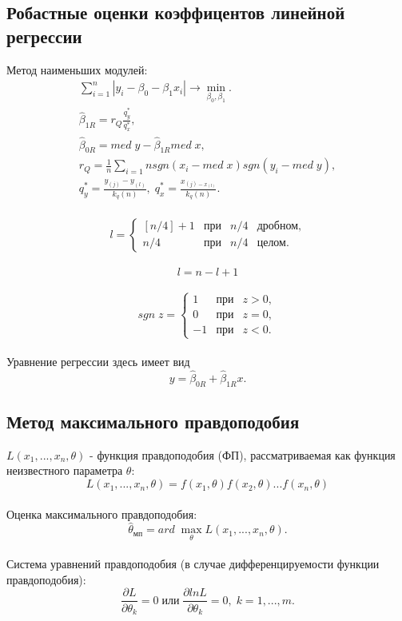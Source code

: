 \subsection {Робастные оценки коэффицентов линейной регрессии}
	Метод наименьших модулей:\\
	\begin{eqnarray} 
		\sum_{i=1}^n|y_i - \beta_0 - \beta_1x_i| \rightarrow \min_{\beta_0, \beta_1}. \\
		\hat\beta_{1R} = r_Q\frac{q_y^*}{q_x^*}, \\
		\hat\beta_{0R} = med \; y - \hat\beta_{1R} med \; x, \\
		r_Q = \frac{1}{n}\sum_{i=1}{n}sgn(x_i - med \; x) sgn(y_i - med \; y), \\
		q_y^* = \frac{y_{(j)} - y_{(l)}}{k_q(n)}, \; q_x^* = \frac{x_{(j) - x_{(l)}}}{k_q(n)}.
	\end{eqnarray}\\
	$$l = \left\{\begin{array}{cccc}
			[n/4] + 1 & \text{при} & n/4 & \text{дробном}, \\
			 n/4 & \text{при} & n/4  & \text{целом}.
			\end{array}\right.$$\\
	$$l = n - l + 1$$\\
	$$sgn \; z = \left\{\begin{array}{ccc}
					1 & \text{при} & z > 0, \\
					0 & \text{при} & z = 0, \\ 
					-1 & \text{при} & z < 0.
					\end{array}\right.$$\\
	Уравнение регрессии здесь имеет вид\\
	\begin{equation}y = \hat\beta_{0R} + \hat\beta_{1R}x.\end{equation}
				 

\subsection {Метод максимального правдоподобия}
	$L(x_1, ..., x_n, \theta)$ - функция правдоподобия (ФП), рассматриваемая как функция неизвестного параметра $\theta$:\\
	\begin{equation} L(x_1, ..., x_n, \theta) = f(x_1, \theta) f(x_2, \theta) ... f(x_n, \theta) \end{equation}\\
	Оценка максимального правдоподобия:\\
	\begin{equation} \hat\theta_{мп} = ard \; \max_\theta L(x_1, ..., x_n, \theta). \end{equation}\\
	Система уравнений правдоподобия (в случае дифференцируемости функции правдоподобия):\\
	\begin{equation} \frac{\partial L}{\partial \theta_k} = 0 \; \text{или} \; \frac{\partial ln L}{\partial \theta_k} = 0, \; k = 1, ..., m.\end{equation}

